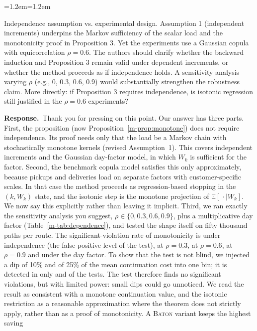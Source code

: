 \documentclass[11pt]{article}
\newenvironment{comment}{\par\medskip\noindent\color{rev}\itshape
  \begin{list}{}{\leftmargin=1.2em\rightmargin=1.2em}\item[]}%
  {\end{list}\par}
\newcommand{\resp}{\par\noindent\textbf{Response.}\ }
\newcommand{\tref}[1]{Table~\ref{m-#1}}
\newcommand{\BATON}{\textsc{Baton}}
\begin{document}
\begin{comment}
Independence assumption vs. experimental design. Assumption 1
(independent increments) underpins the Markov sufficiency of the scalar
load and the monotonicity proof in Proposition 3. Yet the experiments
use a Gaussian copula with equicorrelation $\rho = 0.6$. The authors
should clarify whether the backward induction and Proposition 3 remain
valid under dependent increments, or whether the method proceeds as if
independence holds. A sensitivity analysis varying $\rho$ (e.g., 0,
0.3, 0.6, 0.9) would substantially strengthen the robustness claim.
More directly: if Proposition 3 requires independence, is isotonic
regression still justified in the $\rho = 0.6$ experiments?
\end{comment}
\resp Thank you for pressing on this point. Our answer has three
parts. First, the proposition (now Proposition~\ref{m-prop:monotone})
does not require independence. Its proof needs only that the load be a
Markov chain with stochastically monotone kernels (revised
Assumption~1). This covers independent increments and the Gaussian
day-factor model, in which $W_k$ is sufficient for the factor. Second,
the benchmark copula model satisfies this only approximately, because
pickups and deliveries load on separate factors with customer-specific
scales. In that case the method proceeds as regression-based stopping
in the $(k,W_k)$ state, and the isotonic step is the monotone projection
of $\mathbb E[\,\cdot \mid W_k]$. We now say this explicitly rather than
leaving it implicit. Third, we ran exactly the sensitivity analysis you
suggest, $\rho \in \{0, 0.3, 0.6, 0.9\}$, plus a multiplicative day
factor (\tref{tab:dependence}), and tested the shape itself on fifty
thousand paths per route. The significant-violation rate of monotonicity
is \shapeViolZero{} under independence (the false-positive level of the
test), \shapeViolThree{} at $\rho = 0.3$, \shapeViolSix{} at $\rho =
0.6$, \shapeViolNine{} at $\rho = 0.9$ and \shapeViolDayfac{} under the
day factor. To show that the test is not blind, we injected a dip of
10\% and of 25\% of the mean continuation cost into one bin; it is
detected in only \shapePowTenAll{} and \shapePowTwentyFiveAll{} of the
tests. The test therefore finds no significant violations, but with
limited power: small dips could go unnoticed. We read the result as
consistent with a monotone continuation value, and the isotonic
restriction as a reasonable approximation where the theorem does not
strictly apply, rather than as a proof of monotonicity. A \BATON{} variant keeps the highest saving
\end{document}
